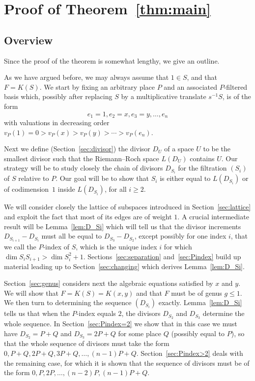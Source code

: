 \documentclass[10pt]{amsart}
\theoremstyle{definition}
\theoremstyle{remark}
\renewcommand{\geq}{\geqslant}
\renewcommand{\leq}{\leqslant}
\begin{document}
\section{Proof of Theorem~\ref{thm:main}}\label{sec:proof_main}

\subsection{Overview} Since the proof of the theorem is somewhat lengthy, we give an outline.

As we have argued before, we may always assume that $1\in S$, and that $F=K(S)$. We start by fixing an arbitrary place $P$ and an associated $P$-filtered basis which, possibly after replacing $S$ by a multiplicative translate $s^{-1}S$, is of the form
\[
e_1=1,e_2=x,e_3=y,\ldots, e_n
\]
with valuations in decreasing order $v_P(1)=0>v_P(x)>v_P(y)>\cdots >v_P(e_n)$.

Next we define (Section~\ref{sec:divisor}) the divisor $D_U$ of a space $U$ to be the smallest divisor such that the Riemann--Roch space {$L(D_U)$} contains $U$. Our strategy will be to study closely the chain of divisors $D_{S_i}$ for the filtration $(S_i)$ of $S$ relative to $P$. Our goal will be to show that $S_i$ is either equal to $L(D_{S_i})$ or of codimension~$1$ inside $L(D_{S_i})$, for all $i\geq2$.

We will consider closely the lattice of subspaces introduced in Section~\ref{sec:lattice} and exploit the fact that most of its edges are of weight $1$. A crucial intermediate result will be Lemma~\ref{lem:D_Si} which will tell us that the divisor increments $D_{S_{i+1}}-D_{S_i}$ must all be equal to $D_{S_3}-D_{S_2}$, except possibly for one index $i$, that we call the $P$-index of $S$, which is the unique index $i$ for which $\dim S_iS_{i+1}>\dim S_i^2+1$. Sections~\ref{sec:separation} and~\ref{sec:Pindex} build up material leading up to Section~\ref{sec:changing} which derives Lemma~\ref{lem:D_Si}.

Section~\ref{sec:genus} considers next the algebraic equations satisfied by $x$ and $y$. We will show that $F=K(S)=K(x,y)$ and that $F$ must be of genus $g\leq1$. We then turn to determining the sequence $(D_{S_i})$ exactly. Lemma~\ref{lem:D_Si} tells us that when the $P$-index equals $2$, the divisors $D_{S_2}$ and $D_{S_3}$ determine the whole sequence. In Section~\ref{sec:Pindex=2} we show that in this case we must have $D_{S_2}=P+Q$ and $D_{S_3}=2P+Q$ for some place $Q$ (possibly equal to $P$), so that the whole sequence of divisors must take the form $0,P+Q,2P+Q,3P+Q,\ldots,(n-1)P+Q$. Section~\ref{sec:Pindex>2} deals with the remaining case, for which it is shown that the sequence of divisors must be of the form $0,P,2P,\ldots,(n-2)P,(n-1)P+Q$.
\end{document}
